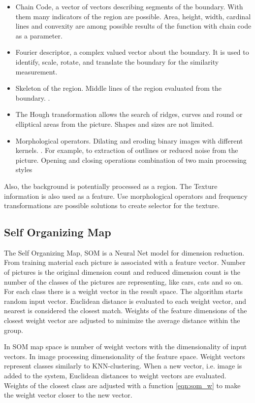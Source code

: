 \documentclass[doc/report.tex]{subfiles}
\begin{document}
\begin{itemize}
    \item Chain Code, a vector of vectors describing segments of the boundary.
        With them many indicators of the region are possible. Area, height,
        width, cardinal lines and convexity are among possible results of the
        function with chain code as a parameter.
    \item Fourier descriptor, a complex valued vector about the boundary. It is
        used to identify, scale, rotate, and translate the boundary for the
        similarity measurement.
    \item Skeleton of the region. Middle lines of the region evaluated from the
        boundary. .
    \item The Hough transformation allows the search of ridges, curves and
        round or elliptical areas from the picture. Shapes and sizes are not
        limited.
    \item Morphological operators. Dilating and eroding binary images with
        different kernels. . For example, to extraction of outlines or reduced
        noise from the picture. Opening and closing operations combination of
        two main processing styles
\end{itemize}

Also, the background is potentially processed as a region. The Texture
information is also used as a feature. Use morphological operators and
frequency transformations are possible solutions to create selector for the
texture.


\subsection{Self Organizing Map}
The Self Organizing Map, SOM is a Neural Net model for dimension reduction.
From training material each picture is associated with a feature vector. Number
of pictures is the original dimension count and reduced dimension count is the
number of the classes of the pictures are representing, like cars, cats and so
on. For each class there is a weight vector in  the result space. The algorithm
starts random input vector. Euclidean distance is evaluated to each weight
vector, and nearest is considered the closest match. Weights of the feature
dimensions of the closest weight vector are adjusted to minimize the average
distance within the group.

In SOM map space is number of weight vectors with the dimensionality of input
vectors. In image processing dimensionality of the feature space. Weight
vectors represent classes similarly to KNN-clustering. When a new vector, i.e.
image is added to the system, Euclidean distances to weight vectors are
evaluated. Weights of the closest class are adjusted with a function
\eqref{eqn:som_w} to make the weight vector closer to the new vector.
\end{document}
